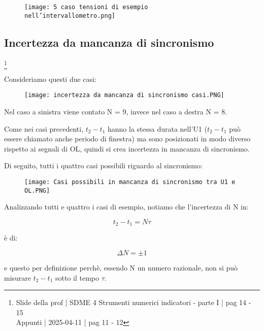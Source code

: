 \begin{figure}[h]
    \centering
    \texttt{[image: 5 caso tensioni di esempio nell'intervallometro.png]}
\end{figure}

\newpage 

\subsection{Incertezza da mancanza di sincronismo}
\footnote{Slide della prof | SDME 4 Strumenti numerici indicatori - parte I | pag 14 - 15 \\  
Appunti | 2025-04-11 | pag 11 - 12}

Consideriamo questi due casi: 

\begin{figure}[h]
    \centering
    \texttt{[image: incertezza da mancanza di sincronismo casi.PNG]}
\end{figure}

Nel caso a sinistra viene contato N = 9, invece nel caso a destra N = 8. \newline 

Come nei casi precedenti, $t_2 - t_1$ hanno la stessa durata nell'U1 ($t_2 - t_1$ può essere chiamato anche periodo di finestra) 
ma sono posizionati in modo diverso rispetto ai segnali di OL, 
quindi si crea incertezza in mancanza di sincronismo. \newline

Di seguito, tutti i quattro casi possibili riguardo al sincronismo: 

\begin{figure}[h]
    \centering
    \texttt{[image: Casi possibili in mancanza di sincronismo tra U1 e OL.PNG]}
\end{figure}

Analizzando tutti e quattro i casi di esempio, notiamo che l'incertezza di N in: 

{
    \Large 
    \begin{equation}
        t_2 - t_1 = N \tau
    \end{equation}
} 

è di: 

{
    \Large 
    \begin{equation}
        \Delta N = \pm 1
    \end{equation}
} 

e questo per definizione perchè, essendo N un numero razionale, non si può misurare $t_2 - t_1$ sotto il tempo $\tau$. \newline 

